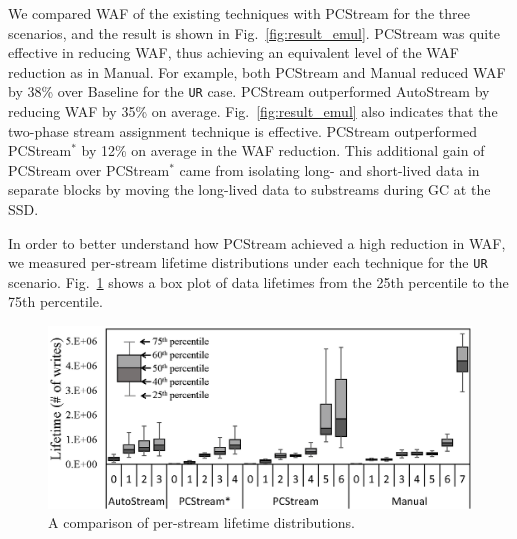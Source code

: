 We compared WAF of the existing techniques with \textsf{\small PCStream} for the three
scenarios, and the result is shown in Fig.~\ref{fig:result_emul}.
\textsf{\small PCStream} was quite effective in reducing WAF, 
thus achieving an equivalent level of the WAF reduction as in \textsf{\small Manual}.  
For example, both \textsf{\small PCStream} and \textsf{\small Manual} reduced WAF by 38\% over \textsf{\small Baseline} for the \texttt{UR} case. 
\textsf{\small PCStream} outperformed \textsf{\small AutoStream} by reducing WAF by 35\% on average.
Fig.~\ref{fig:result_emul} also indicates that the two-phase stream assignment technique is effective.  
\textsf{\small PCStream} outperformed \textsf{\small PCStream$^{*}$} by 12\% on average in the WAF reduction.
This additional gain of \textsf{\small PCStream} over \textsf{\small PCStream$^{*}$} came from isolating long- and short-lived data in separate blocks 
by moving the long-lived data to substreams during GC at the SSD.


In order to better understand how \textsf{\small PCStream} achieved a high reduction in WAF, 
we measured per-stream lifetime distributions under each technique for the \texttt{UR} scenario.
Fig.~\ref{fig:stream_lifetime} shows a box plot of data lifetimes from the 25th percentile to the 75th percentile.

\begin{figure}[t]
	\centering
	\includegraphics[scale=0.6]{figure/pcstream/stream_lifetime}
	\caption{A comparison of per-stream lifetime distributions.}
	\label{fig:stream_lifetime}
\end{figure}




